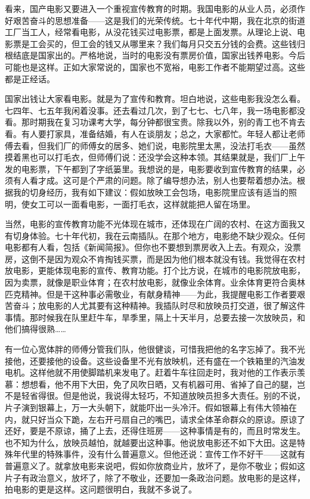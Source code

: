 看来，国产电影又要进入一个重视宣传教育的时期。我国电影的从业人员，必须作好艰苦奋斗的思想准备——这是我们的光荣传统。七十年代中期，我在北京的街道工厂当工人，经常看电影，从没花钱买过电影票，都是上面发票。从理论上说、电影票是工会买的，但工会的钱又从哪里来？我们每月只交五分钱的会费。这些钱归根结底是国家出的。严格地说，当时的电影没有票房价值，国家出钱养电影。今后可能也是这样。正如大家常说的，国家也不宽裕，电影工作者不能期望过高。这些都是正经话。 

国家出钱让大家看电影。就是为了宣传和教育。坦白地说，这些电影我没怎么看。七四年、七五年我闲着没事。还去看过几次，到了七七、七八年，我一场电影都没看。那时期我在复习功课考大学，每分钟都很宝贵。除我以外，别的青工也不肯去看。有人要打家具，准备结婚，有人在谈朋友；总之，大家都忙。年轻人都让老师傅去看，但我们厂的师傅女的居多、她们说，电影院里太黑，没法打毛衣——虽然摸着黑也可以打毛衣，但师傅们说：还没学会这种本领。其结果就是，我们厂上午发的电影票，下午都到了字纸篓里。我想说的是，电影要收到宣传教育的结果，必须有人看才成。这可是个严肃的问题。除了编导想办法，别人也要帮着想办法。根据我的切身经历，我有如下建议：假如放映工会包场，电影院里应该有适当的照明，使女工可以一面看电影，一面打毛衣，这样就能把人留在场里。 

当然，电影的宣传教育功能不光体现在城市，还体现在广阔的农村、在这方面我又有切身体验。七十年代初，我在云南插队。在那个地方，电影绝不缺少观众。任何电影都有人看，包括《新闻简报》。但你也不要想到票房收入上去。有观众，没票房，这倒不是因为观众不肯掏钱买票，而是因为他们根本就没有钱。我觉得在农村放电影，更能体现电影的宣传、教育功能。打个比方说，在城市的电影院放电影，因为卖票，就像是职业体育；在农村放电影，就像业余体育。业余体育更符合奥林匹克精神。但是干这种事必需敬业，有献身精神——为此，我提醒电影工作者要艰苦奋斗；放电影的人尤其要有这种精神。我插队时尽和放映员打交道，很了解这件事情。那时候我在队里赶牛车，旱季里，隔上十天半月，总要去接一次放映员，和他们搞得很熟…… 

有一位心宽体胖的师傅分管我们队，他很健谈，可惜我把他的名字忘掉了。我不光接他，还要接他的设备。这些设备里不光有放映机，还有盛在一个铁箱里的汽油发电机。这样他就不用使脚踏机来发电了。赶着牛车往回走时，我对他的工作表示羡慕：想想看，他不用下大田，免了风吹日晒，又有机器可用、省掉了自己的腿，岂不是轻省得很。但是他说，我说得太轻巧，不知道放映员担多大责任。别的不说，片子演到银幕上，万一大头朝下，就能吓出一头冷汗。假如银幕上有伟大领袖在内，就只好当众下跪，左右开弓扇自己的嘴巴，请求全体革命群众的原谅。原谅了还好，要是不原谅，捅了上去，还得住班房——这种事情是有的，而且时常发生。也不知为什么，放映员越怕，就越要出这种事。他说放电影还不如下大田。这是特殊年代里的特殊事件，没有什么普遍意义。但他还说：宣传工作不好干——这就有普遍意义了。就拿放电影来说吧，假如你放商业片，放坏了，是你不敬业；假如这片子有政治意义，放坏了，除了不敬业，还要加一条政治问题。放电影的是这样，拍电影的更是这样。这问题很明白，我就不多说了。 

